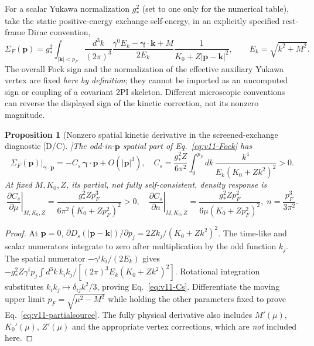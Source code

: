 \documentclass[11pt,a4paper]{article}
\newtheorem{proposition}{Proposition}[section]\newtheorem{lemma}[proposition]{Lemma}\newtheorem{definition}[proposition]{Definition}\newtheorem{remark}[proposition]{Remark}
\begin{document}
For a scalar Yukawa normalization $g_*^2$ (set to one only for the numerical table), take the static positive-energy exchange self-energy, in an explicitly specified rest-frame Dirac convention,
\begin{equation}\label{eq:v11-Fock}
\Sigma_F(\bm p)=g_*^2\int_{|\bm k|<p_F}\frac{d^3k}{(2\pi)^3}
 \frac{\gamma^0 E_k-\bm\gamma\!\cdot\!\bm k+M}{2E_k}
 \frac1{K_0+Z|\bm p-\bm k|^2},\qquad E_k=\sqrt{k^2+M^2}.
\end{equation}
The overall Fock sign and the normalization of the effective auxiliary Yukawa vertex are fixed \emph{here by definition}; they cannot be imported as an uncomputed sign or coupling of a covariant 2PI skeleton. Different microscopic conventions can reverse the displayed sign of the kinetic correction, not its nonzero magnitude.

\begin{proposition}[Nonzero spatial kinetic derivative in the screened-exchange diagnostic [D/C]]\label{prop:v11-Cs}
The odd-in-$\bm p$ spatial part of Eq.~\eqref{eq:v11-Fock} has
\begin{equation}\label{eq:v11-Cs}
\boxed{\Sigma_F(\bm p)\big|_{\bm\gamma\cdot\bm p}=-C_s\,\bm\gamma\cdot\bm p+O(|\bm p|^3),\quad
 C_s=\frac{g_*^2Z}{6\pi^2}\int_0^{p_F}\!dk\,
 \frac{k^4}{E_k(K_0+Zk^2)^2}>0.}
\end{equation}
At fixed $M,K_0,Z$, its \emph{partial}, not fully self-consistent, density response is
\begin{equation}\label{eq:v11-partialsource}
\boxed{\left.\frac{\partial C_s}{\partial\mu}\right|_{M,K_0,Z}
 =\frac{g_*^2 Zp_F^3}{6\pi^2(K_0+Zp_F^2)^2}>0,\quad
 \left.\frac{\partial C_s}{\partial n}\right|_{M,K_0,Z}
 =\frac{g_*^2 Zp_F^2}{6\mu(K_0+Zp_F^2)^2},\;n=\frac{p_F^3}{3\pi^2}.}
\end{equation}
\end{proposition}
\begin{proof}
At $\bm p=0$, $\partial D_s(|\bm p-\bm k|)/\partial p_j=2Zk_j/(K_0+Zk^2)^2$. The time-like and scalar numerators integrate to zero after multiplication by the odd function $k_j$. The spatial numerator $-\gamma^i k_i/(2E_k)$ gives $-g_*^2Z\gamma^i p_j\int d^3k\,k_i k_j/[ (2\pi)^3 E_k(K_0+Zk^2)^2]$. Rotational integration substitutes $k_i k_j\mapsto\delta_{ij}k^2/3$, proving Eq.~\eqref{eq:v11-Cs}. Differentiate the moving upper limit $p_F=\sqrt{\mu^2-M^2}$ while holding the other parameters fixed to prove Eq.~\eqref{eq:v11-partialsource}. The fully physical derivative also includes $M'(\mu)$, $K_0'(\mu)$, $Z'(\mu)$ and the appropriate vertex corrections, which are \emph{not} included here.
\end{proof}
\end{document}
